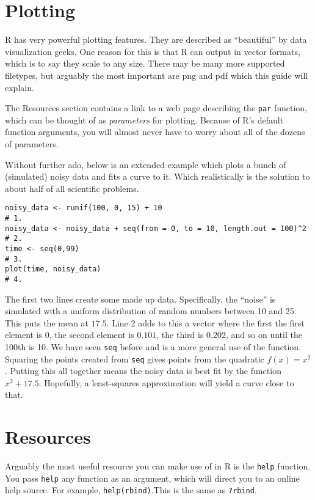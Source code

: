\documentclass[12pt]{article}
\begin{document}
\section{Plotting}

R has very powerful plotting features. They are described as ``beautiful'' by data visualization geeks. One reason for this is that R can output in vector formats, which is to say they scale to any size. There may be many more supported filetypes, but arguably the most important are png and pdf which this guide will explain.

The Resources section contains a link to a web page describing the \verb|par| function, which can be thought of as \emph{parameters} for plotting. Because of R's default function arguments, you will almost never have to worry about all of the dozens of parameters.

Without further ado, below is an extended example which plots a bunch of (simulated) noisy data and fits a curve to it. Which realistically is the solution to about half of all scientific problems.

\begin{verbatim}
noisy_data <- runif(100, 0, 15) + 10                                   # 1.
noisy_data <- noisy_data + seq(from = 0, to = 10, length.out = 100)^2  # 2.
time <- seq(0,99)                                                      # 3.
plot(time, noisy_data)                                                 # 4.
\end{verbatim}

The first two lines create some made up data. Specifically, the ``noise'' is simulated with a uniform distribution of random numbers between 10 and 25. This puts the mean at $17.5$. Line 2 adds to this a vector where the first the first element is 0, the second element is $0.\overline{101}$, the third is $0.\overline{202}$, and so on until the 100th is 10. We have seen \verb|seq| before and is a more general use of the function. Squaring the points created from \verb|seq| gives points from the quadratic $f(x) = x^2$. Putting this all together means the noisy data is best fit by the function $x^2 + 17.5$. Hopefully, a least-squares approximation will yield a curve close to that.



\section{Resources}
Arguably the most useful resource you can make use of in R is the \verb|help| function. You pass \verb|help| any function as an argument, which will direct you to an online help source. For example, \verb|help(rbind)|.This is the same as \verb|?rbind|.
\end{document}
